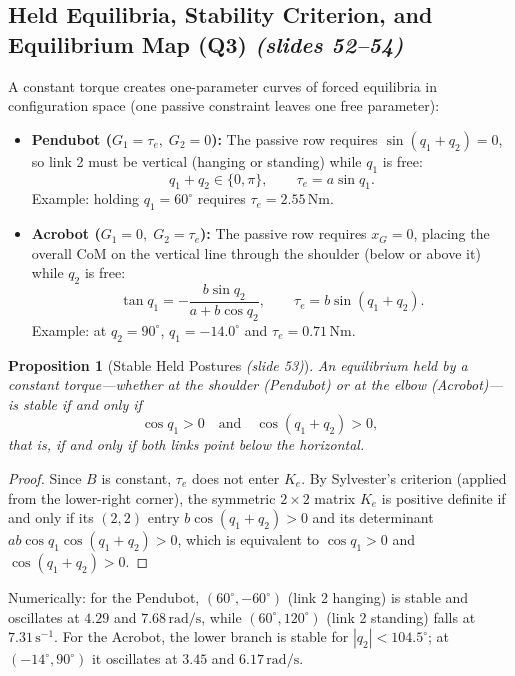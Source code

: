 \documentclass[11pt, a4paper]{article}
\theoremstyle{definition}
\theoremstyle{plain}
\newtheorem{proposition}[definition]{Proposition}
\begin{document}
\subsection{Held Equilibria, Stability Criterion, and Equilibrium Map (Q3) \emph{(slides 52--54)}}

A constant torque creates one-parameter curves of forced equilibria in configuration space (one passive constraint leaves one free parameter):
\begin{itemize}
  \item \textbf{Pendubot ($G_1 = \tau_e,\; G_2 = 0$):} The passive row requires $\sin(q_1 + q_2) = 0$, so link 2 must be vertical (hanging or standing) while $q_1$ is free:
  \[
    q_1 + q_2 \in \{0, \pi\}, \qquad \tau_e = a \sin q_1.
  \]
  Example: holding $q_1 = 60^\circ$ requires $\tau_e = 2.55\,\mathrm{Nm}$.
  \item \textbf{Acrobot ($G_1 = 0,\; G_2 = \tau_e$):} The passive row requires $x_G = 0$, placing the overall CoM on the vertical line through the shoulder (below or above it) while $q_2$ is free:
  \[
    \tan q_1 = -\frac{b\sin q_2}{a + b\cos q_2}, \qquad \tau_e = b\sin(q_1 + q_2).
  \]
  Example: at $q_2 = 90^\circ$, $q_1 = -14.0^\circ$ and $\tau_e = 0.71\,\mathrm{Nm}$.
\end{itemize}

\begin{proposition}[Stable Held Postures \emph{(slide 53)}]
An equilibrium held by a constant torque---whether at the shoulder (Pendubot) or at the elbow (Acrobot)---is stable if and only if
\[
  \cos q_1 > 0 \quad \text{and} \quad \cos(q_1 + q_2) > 0,
\]
that is, if and only if \emph{both links point below the horizontal}.
\end{proposition}

\begin{proof}
Since $B$ is constant, $\tau_e$ does not enter $K_e$. By Sylvester's criterion (applied from the lower-right corner), the symmetric $2 \times 2$ matrix $K_e$ is positive definite if and only if its $(2,2)$ entry $b\cos(q_1+q_2) > 0$ and its determinant $ab\cos q_1 \cos(q_1+q_2) > 0$, which is equivalent to $\cos q_1 > 0$ and $\cos(q_1+q_2) > 0$.
\end{proof}

Numerically: for the Pendubot, $(60^\circ, -60^\circ)$ (link 2 hanging) is stable and oscillates at $4.29$ and $7.68\,\mathrm{rad/s}$, while $(60^\circ, 120^\circ)$ (link 2 standing) falls at $7.31\,\mathrm{s}^{-1}$. For the Acrobot, the lower branch is stable for $|q_2| < 104.5^\circ$; at $(-14^\circ, 90^\circ)$ it oscillates at $3.45$ and $6.17\,\mathrm{rad/s}$.
\end{document}
